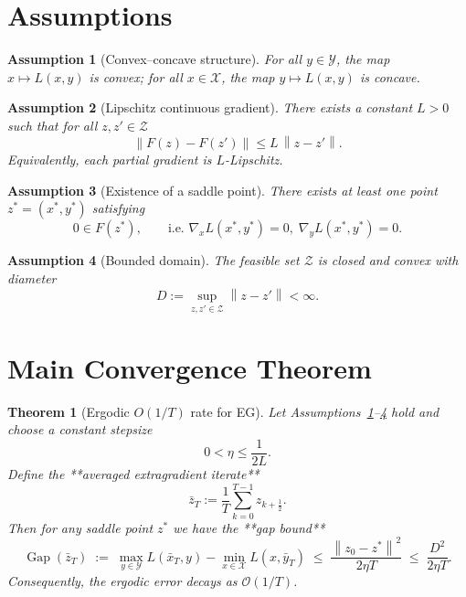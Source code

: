 \documentclass{article}
\newtheorem{theorem}{Theorem}
\newtheorem{assumption}{Assumption}
\newcommand{\norm}[1]{\left\lVert#1\right\rVert}
\newcommand{\gap}{\operatorname{Gap}}
\begin{document}
\section*{Assumptions}
\begin{assumption}[Convex–concave structure]\label{ass:convexconcave}
For all \(y\in\mathcal Y\), the map \(x\mapsto L(x,y)\) is convex;   
for all \(x\in\mathcal X\), the map \(y\mapsto L(x,y)\) is concave.
\end{assumption}
\begin{assumption}[Lipschitz continuous gradient]\label{ass:smooth}
There exists a constant \(L>0\) such that for all \(z,z'\in\mathcal Z\)
\[
\norm{F(z)-F(z')}\le L\,\norm{z-z'}.
\]
Equivalently, each partial gradient is \(L\)-Lipschitz.
\end{assumption}
\begin{assumption}[Existence of a saddle point]\label{ass:saddle}
There exists at least one point \(z^{*}=(x^{*},y^{*})\) satisfying
\[
0\in F(z^{*}),\qquad\text{i.e. } \nabla_{x}L(x^{*},y^{*})=0,\; \nabla_{y}L(x^{*},y^{*})=0 .
\]
\end{assumption}
\begin{assumption}[Bounded domain]\label{ass:bounded}
The feasible set \(\mathcal Z\) is closed and convex with diameter
\[
D:=\sup_{z,z'\in\mathcal Z}\norm{z-z'}<\infty .
\]
\end{assumption}

\section*{Main Convergence Theorem}
\begin{theorem}[Ergodic $O(1/T)$ rate for EG]\label{thm:ergodic}
Let Assumptions~\ref{ass:convexconcave}–\ref{ass:bounded} hold and choose a constant stepsize
\[
0<\eta\le \frac{1}{2L}.
\]
Define the **averaged extragradient iterate**
\[
\bar z_{T}:=\frac1T\sum_{k=0}^{T-1}z_{k+\frac12}.
\]
Then for any saddle point \(z^{*}\) we have the **gap bound**
\[
\gap(\bar z_{T})\;:=\;
\max_{y\in\mathcal Y}L(\bar x_{T},y)-\min_{x\in\mathcal X}L(x,\bar y_{T})
\;\le\;
\frac{\norm{z_{0}-z^{*}}^{2}}{2\eta T}
\;\le\;
\frac{D^{2}}{2\eta T}.
\]
Consequently, the ergodic error decays as \(\mathcal O(1/T)\).
\end{theorem}
\end{document}
